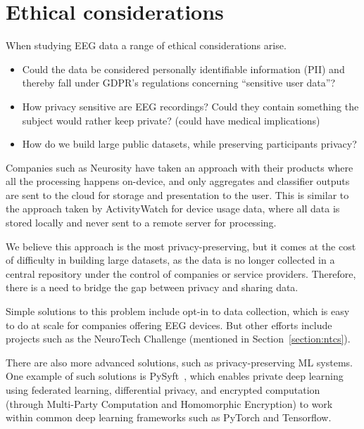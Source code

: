 \section{Ethical considerations}

    When studying EEG data a range of ethical considerations arise. 

    \begin{itemize}
        \item Could the data be considered personally identifiable information (PII) and thereby fall under GDPR's regulations concerning ``sensitive user data''? 
        \item How privacy sensitive are EEG recordings? Could they contain something the subject would rather keep private? (could have medical implications)
        \item How do we build large public datasets, while preserving participants privacy?
    \end{itemize}

    Companies such as Neurosity have taken an approach with their products where all the processing happens on-device, and only aggregates and classifier outputs are sent to the cloud for storage and presentation to the user. This is similar to the approach taken by ActivityWatch for device usage data, where all data is stored locally and never sent to a remote server for processing. 

    We believe this approach is the most privacy-preserving, but it comes at the cost of difficulty in building large datasets, as the data is no longer collected in a central repository under the control of companies or service providers. Therefore, there is a need to bridge the gap between privacy and sharing data.

    Simple solutions to this problem include opt-in to data collection, which is easy to do at scale for companies offering EEG devices. But other efforts include projects such as the NeuroTech Challenge (mentioned in Section~\ref{section:ntcs}).

    There are also more advanced solutions, such as privacy-preserving ML systems. One example of such solutions is PySyft~\cite{trask_pysyft_2021}, which enables private deep learning using federated learning, differential privacy, and encrypted computation (through Multi-Party Computation and Homomorphic Encryption) to work within common deep learning frameworks such as PyTorch and Tensorflow.

